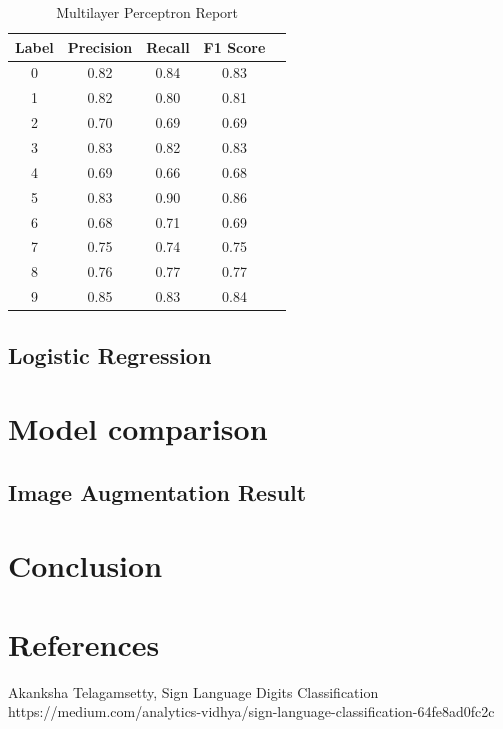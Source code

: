 \documentclass[conference]{IEEEtran}
\begin{document}
\begin{table}[!h]
    \centering
    \begin{tabular}{|c|c|c|c|r|}
        \hline
        \textbf{Label} & \textbf{Precision} & \textbf{Recall} & \textbf{F1 Score} \\ \hline
        0              & 0.82               & 0.84            & 0.83              \\ \hline
        1              & 0.82               & 0.80            & 0.81              \\ \hline
        2              & 0.70               & 0.69            & 0.69              \\ \hline
        3              & 0.83               & 0.82            & 0.83              \\ \hline
        4              & 0.69               & 0.66            & 0.68              \\ \hline
        5              & 0.83               & 0.90            & 0.86              \\ \hline
        6              & 0.68               & 0.71            & 0.69              \\ \hline
        7              & 0.75               & 0.74            & 0.75              \\ \hline
        8              & 0.76               & 0.77            & 0.77              \\ \hline
        9              & 0.85               & 0.83            & 0.84              \\ \hline
    \end{tabular}
    \label{tab:mlp_classification_report}
    \caption{Multilayer Perceptron Report}
\end{table}



\subsection{Logistic Regression}

\section{Model comparison}

\subsection{Image Augmentation Result}
\section{Conclusion}

\section{References}

\begin{thebibliography}{00}
     Akanksha Telagamsetty, Sign Language Digits Classification https://medium.com/analytics-vidhya/sign-language-classification-64fe8ad0fc2c
\end{thebibliography}
\end{document}
